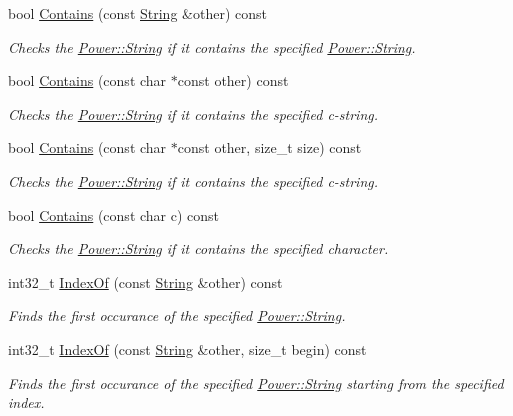 \begin{DoxyCompactItemize}
bool \hyperlink{class_power_1_1_string_aeaa32e499b49e67539953355b53609a8}{Contains} (const \hyperlink{class_power_1_1_string}{String} \&other) const
\begin{DoxyCompactList}\small\item\em Checks the \hyperlink{class_power_1_1_string}{Power\+::\+String} if it contains the specified \hyperlink{class_power_1_1_string}{Power\+::\+String}. \end{DoxyCompactList}\item 
bool \hyperlink{class_power_1_1_string_ad90a05c6e07bcd98684bd7c2aec7723f}{Contains} (const char $\ast$const other) const
\begin{DoxyCompactList}\small\item\em Checks the \hyperlink{class_power_1_1_string}{Power\+::\+String} if it contains the specified c-\/string. \end{DoxyCompactList}\item 
bool \hyperlink{class_power_1_1_string_a594f79ac18d754ee0cc7c5fed1841eae}{Contains} (const char $\ast$const other, size\+\_\+t size) const
\begin{DoxyCompactList}\small\item\em Checks the \hyperlink{class_power_1_1_string}{Power\+::\+String} if it contains the specified c-\/string. \end{DoxyCompactList}\item 
bool \hyperlink{class_power_1_1_string_a728af5dfae32933d8548a657d7cd2043}{Contains} (const char c) const
\begin{DoxyCompactList}\small\item\em Checks the \hyperlink{class_power_1_1_string}{Power\+::\+String} if it contains the specified character. \end{DoxyCompactList}\item 
int32\+\_\+t \hyperlink{class_power_1_1_string_a070007dc59daa019784a7569a15c94c7}{Index\+Of} (const \hyperlink{class_power_1_1_string}{String} \&other) const
\begin{DoxyCompactList}\small\item\em Finds the first occurance of the specified \hyperlink{class_power_1_1_string}{Power\+::\+String}. \end{DoxyCompactList}\item 
int32\+\_\+t \hyperlink{class_power_1_1_string_a84764e8dc11b1bb23678696e9c4c78f5}{Index\+Of} (const \hyperlink{class_power_1_1_string}{String} \&other, size\+\_\+t begin) const
\begin{DoxyCompactList}\small\item\em Finds the first occurance of the specified \hyperlink{class_power_1_1_string}{Power\+::\+String} starting from the specified index. \end{DoxyCompactList}\item 

\end{DoxyCompactItemize}
